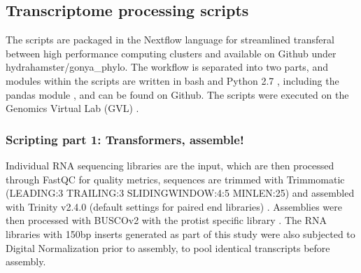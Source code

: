 \documentclass[12pt]{article}
\begin{document}
\subsection*{Transcriptome processing scripts}
The scripts are packaged in the Nextflow language \cite{nextflow} for streamlined transferal between high performance computing clusters and available on Github under hydrahamster/gonya\_phylo. 
The workflow is separated into two parts, and modules within the scripts are written in bash and Python 2.7 \cite{python}, including the pandas module \cite{pandas}, and can be found on Github. 
The scripts were executed on the Genomics Virtual Lab (GVL) \cite{afgan2015genomics}.
\subsubsection*{Scripting part 1: Transformers, assemble!}
Individual RNA sequencing libraries are the input, which are then processed through FastQC \cite{fastqc} for quality metrics, sequences are trimmed with Trimmomatic (LEADING:3 TRAILING:3 SLIDINGWINDOW:4:5 MINLEN:25) \cite{bolger2014trimmomatic} and assembled with Trinity v2.4.0 (default settings for paired end libraries) \cite{haas2013novo}. 
Assemblies were then processed with BUSCOv2 with the protist specific library \cite{simao2015busco}.
The RNA libraries with 150bp inserts generated as part of this study were also subjected to Digital Normalization \cite{diginorm} prior to assembly, to pool identical transcripts before assembly.                                                                                                                                                                                                                                                                                                                                                                                                                                                                                                                                                                                                                                                                                                                                                                                                                                                                                                                                                                                                                                                                                                                                                                                                                                                                                                                                           
\end{document}
